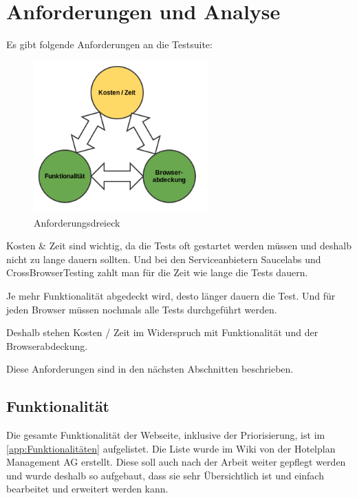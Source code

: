 

\chapter{Anforderungen und Analyse}
\label{sec:analyse}


Es gibt folgende Anforderungen an die Testsuite:
\begin{figure}[H]
	\centering
	\includegraphics[width=0.6\textwidth]{images/triangle.png}
	\caption{Anforderungsdreieck}
	\label{fig:analyse:Anforderungsdreieck}
\end{figure}

Kosten \& Zeit sind wichtig, da die Tests oft gestartet werden müssen und deshalb nicht zu lange dauern sollten. Und bei den Serviceanbietern Saucelabs und CrossBrowserTesting zahlt man für die Zeit wie lange die Tests dauern.

Je mehr Funktionalität abgedeckt wird, desto länger dauern die Test. Und für jeden Browser müssen nochmals alle Tests durchgeführt werden. 

Deshalb stehen Kosten / Zeit im Widerspruch mit Funktionalität und der Browserabdeckung.

Diese Anforderungen sind in den nächsten Abschnitten beschrieben.

\section{Funktionalität}
Die gesamte Funktionalität der Webseite, inklusive der Priorisierung, ist im \cref{app:Funktionalitäten}  aufgelistet. Die Liste wurde im Wiki von der Hotelplan Management AG erstellt. Diese soll auch nach der Arbeit weiter gepflegt werden und wurde deshalb so aufgebaut, dass sie sehr Übersichtlich ist und einfach bearbeitet und erweitert werden kann.

